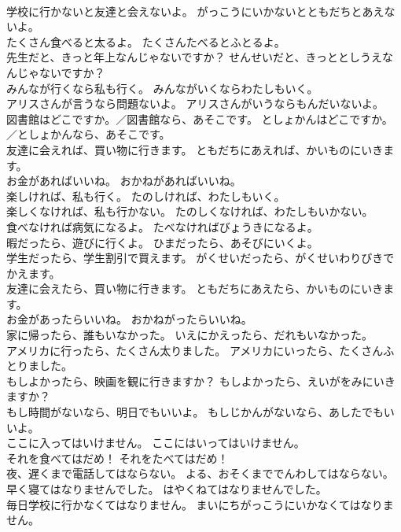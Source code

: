 \documentclass[8pt]{extreport}
\begin{document}
\begin{CJK}{UTF8}{min}
\\	学校に行かないと友達と会えないよ。	がっこうにいかないとともだちとあえないよ。 
\\	たくさん食べると太るよ。	たくさんたべるとふとるよ。 
\\	先生だと、きっと年上なんじゃないですか？	せんせいだと、きっととしうえなんじゃないですか？ 
\\	みんなが行くなら私も行く。	みんながいくならわたしもいく。 
\\	アリスさんが言うなら問題ないよ。	アリスさんがいうならもんだいないよ。 
\\	図書館はどこですか。／図書館なら、あそこです。	としょかんはどこですか。／としょかんなら、あそこです。 
\\	友達に会えれば、買い物に行きます。	ともだちにあえれば、かいものにいきます。 
\\	お金があればいいね。	おかねがあればいいね。 
\\	楽しければ、私も行く。	たのしければ、わたしもいく。 
\\	楽しくなければ、私も行かない。	たのしくなければ、わたしもいかない。 
\\	食べなければ病気になるよ。	たべなければびょうきになるよ。 
\\	暇だったら、遊びに行くよ。	ひまだったら、あそびにいくよ。 
\\	学生だったら、学生割引で買えます。	がくせいだったら、がくせいわりびきでかえます。 
\\	友達に会えたら、買い物に行きます。	ともだちにあえたら、かいものにいきます。 
\\	お金があったらいいね。	おかねがったらいいね。 
\\	家に帰ったら、誰もいなかった。	いえにかえったら、だれもいなかった。 
\\	アメリカに行ったら、たくさん太りました。	アメリカにいったら、たくさんふとりました。 
\\	もしよかったら、映画を観に行きますか？	もしよかったら、えいがをみにいきますか？ 
\\	もし時間がないなら、明日でもいいよ。	もしじかんがないなら、あしたでもいいよ。 
\\	ここに入ってはいけません。	ここにはいってはいけません。 
\\	それを食べてはだめ！	それをたべてはだめ！ 
\\	夜、遅くまで電話してはならない。	よる、おそくまででんわしてはならない。 
\\	早く寝てはなりませんでした。	はやくねてはなりませんでした。 
\\	毎日学校に行かなくてはなりません。	まいにちがっこうにいかなくてはなりません。 

\end{CJK}
\end{document}
